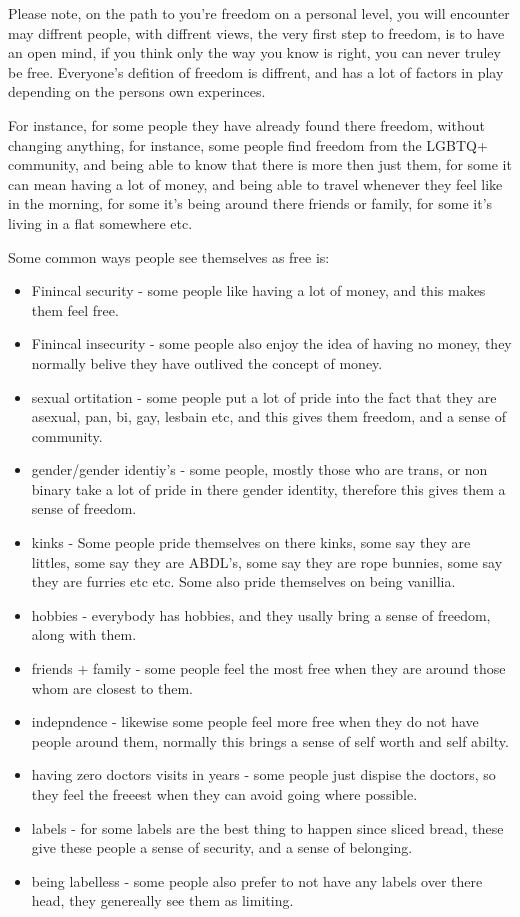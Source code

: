 \documentclass[../main.tex]{subfile}
\begin{document}
Please note, on the path to you're freedom on a personal level, you will encounter may diffrent people, with diffrent views, the very first step to freedom, is to have an open mind, if you think only the way you know is right, you can never truley be free. Everyone's defition of freedom is diffrent, and has a lot of factors in play depending on the persons own experinces.

For instance, for some people they have already found there freedom, without changing anything, for instance, some people find freedom from the LGBTQ+ community, and being able to know that there is more then just them, for some it can mean having a lot of money, and being able to travel whenever they feel like in the morning, for some it's being around there friends or family, for some it's living in a flat somewhere etc.

Some common ways people see themselves as free is:
\begin{itemize}
\item Finincal security - some people like having a lot of money, and this makes them feel free.
\item Finincal insecurity - some people also enjoy the idea of having no money, they normally belive they have outlived the concept of money.
\item sexual ortitation - some people put a lot of pride into the fact that they are asexual, pan, bi, gay, lesbain etc, and this gives them freedom, and a sense of community.
\item gender/gender identiy's - some people, mostly those who are trans, or non binary take a lot of pride in there gender identity, therefore this gives them a sense of freedom.
\item kinks - Some people pride themselves on there kinks, some say they are littles, some say they are ABDL's, some say they are rope bunnies, some say they are furries etc etc. Some also pride themselves on being vanillia.
\item hobbies - everybody has hobbies, and they usally bring a sense of freedom, along with them.
\item friends + family - some people feel the most free when they are around those whom are closest to them.
\item indepndence - likewise some people feel more free when they do not have people around them, normally this brings a sense of self worth and self abilty.
\item having zero doctors visits in years - some people just dispise the doctors, so they feel the freeest when they can avoid going where possible.
\item labels - for some labels are the best thing to happen since sliced bread, these give these people a sense of security, and a sense of belonging.
\item  being labelless - some people also prefer to not have any labels over there head, they genereally see them as limiting.
\end{itemize}
\end{document}
